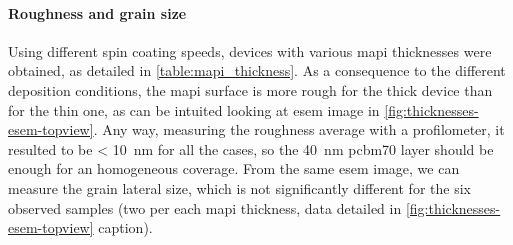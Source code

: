 	\paragraph{Roughness and grain size}
	Using different spin coating speeds, devices with various \gls{mapi} thicknesses were obtained, as detailed in \cref{table:mapi_thickness}.
	As a consequence to the different deposition conditions, the \gls{mapi} surface is more rough for the thick device than for the thin one, as can be intuited looking at \gls{esem} image in \cref{fig:thicknesses-esem-topview}.
	Any way, measuring the roughness average with a profilometer, it resulted to be \SI{< 10}{\nm} for all the cases, so the \SI{40}{\nm} \gls{pcbm70} layer should be enough for an homogeneous coverage.
	From the same \gls{esem} image, we can measure the grain lateral size, which is not significantly different for the six observed samples (two per each \gls{mapi} thickness, data detailed in \cref{fig:thicknesses-esem-topview} caption).

